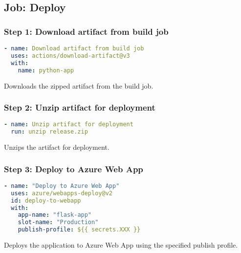 \subsection{Job: Deploy}

\subsubsection{Step 1: Download artifact from build job}
\begin{lstlisting}[language=yaml]
- name: Download artifact from build job
  uses: actions/download-artifact@v3
  with:
    name: python-app
\end{lstlisting}
Downloads the zipped artifact from the build job.

\subsubsection{Step 2: Unzip artifact for deployment}
\begin{lstlisting}[language=yaml]
- name: Unzip artifact for deployment
  run: unzip release.zip
\end{lstlisting}
Unzips the artifact for deployment.

\subsubsection{Step 3: Deploy to Azure Web App}
\begin{lstlisting}[language=yaml]
- name: "Deploy to Azure Web App"
  uses: azure/webapps-deploy@v2
  id: deploy-to-webapp
  with:
    app-name: "flask-app"
    slot-name: "Production"
    publish-profile: ${{ secrets.XXX }}
\end{lstlisting}
Deploys the application to Azure Web App using the specified publish profile.